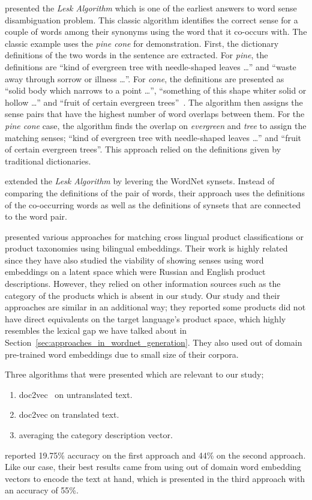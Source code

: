 \textcite{lesk_automatic_1986} presented the \emph{Lesk Algorithm} which is one of the earliest answers to word sense disambiguation problem.
This classic algorithm identifies the correct sense for a couple of words among their synonyms using the word that it co-occurs with.
The classic example uses the \emph{pine cone} for demonstration.
First, the dictionary definitions of the two words in the sentence are extracted.
For \emph{pine}, the definitions are \enquote{kind of evergreen tree with needle-shaped leaves \dots} and \enquote{waste away through sorrow or illness \dots}.
For \emph{cone}, the definitions are presented as \enquote{solid body which narrows to a point \dots}, \enquote{something of this shape whiter solid or hollow \dots} and \enquote{fruit of certain evergreen trees}~\cite{lesk_automatic_1986}.
The algorithm then assigns the sense pairs that have the highest number of word overlaps between them.
For the \emph{pine cone} case, the algorithm finds the overlap on \emph{evergreen} and \emph{tree} to assign the matching senses; \enquote{kind of evergreen tree with needle-shaped leaves \dots} and \enquote{fruit of certain evergreen trees}.
This approach relied on the definitions given by traditional dictionaries.

\textcite{banerjee_adapted_2002} extended the \emph{Lesk Algorithm} by levering the WordNet synsets.
Instead of comparing the definitions of the pair of words, their approach uses the definitions of the co-occurring words as well as the definitions of synsets that are connected to the word pair.

\textcite{gordeev_unsupervised_2018} presented various approaches for matching cross lingual product classifications or product taxonomies using bilingual embeddings.
Their work is highly related since they have also studied the viability of showing senses using word embeddings on a latent space which were Russian and English product descriptions.
However, they relied on other information sources such as the category of the products which is absent in our study.
Our study and their approaches are similar in an additional way; they reported some products did not have direct equivalents on the target language's product space, which highly resembles the lexical gap we have talked about in Section~\ref{sec:approaches_in_wordnet_generation}.
They also used out of domain pre-trained word embeddings due to small size of their corpora.

Three algorithms that were presented which are relevant to our study;
\begin{enumerate}
    \item doc2vec~\cite{le_distributed_2014} on untranslated text.
    \item doc2vec on translated text.
    \item averaging the category description vector.
\end{enumerate}
\citeauthor{gordeev_unsupervised_2018} reported 19.75\% accuracy on the first approach and 44\% on the second approach.
Like our case, their best results came from using out of domain word embedding vectors to encode the text at hand, which is presented in the third approach with an accuracy of 55\%.
